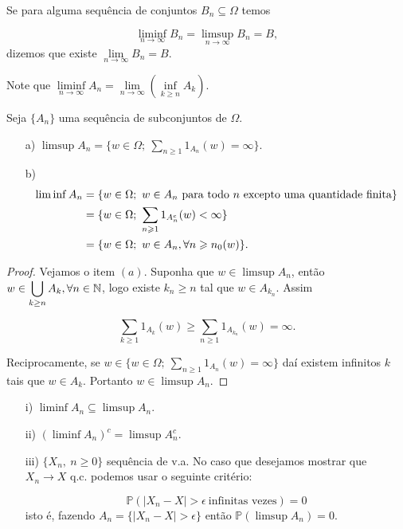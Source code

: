 \begin{definicao}
	Se para alguma sequência de conjuntos $B_n \subseteq \Omega$ temos

	$$
		\liminf \limits_{n \to \infty} B_n = \limsup \limits_{n \to \infty} B_n = B,
	$$	
	dizemos que existe $\lim \limits_{n \to \infty} B_n =B$.
\end{definicao}

Note que $\liminf \limits_{n\to \infty}A_n 
			=
			\lim \limits_{n\to \infty}\left(\inf \limits_{k\geqslant n}A_k \right)
		 $.


\begin{lema}
Seja $\{A_n\}$ uma sequência de subconjuntos de $\Omega$.
\begin{enumerate}
\item[a)] $\limsup A_n = \{ w \in \Omega;\ \sum_{n \geqslant 1} 1_{A_n}(w)= \infty \}$.
\item[b)] 
\begin{align*}
\vspace*{-2cm}
\liminf A_n & = \{ w \in \Omega;\ w \in A_n \text{ para todo $n$ excepto uma quantidade finita} \} \\
			& = \{w \in \Omega;\ \sum_{n\geqslant 1} 1_{A_n^c}(w) < \infty \} \\
			& = \{w \in \Omega;\ w \in A_n, \forall n \geqslant n_0(w) \}. 
\end{align*} 
\end{enumerate}
\end{lema}

\begin{proof}
Vejamos o item $(a)$. Suponha que $w \in \limsup A_n$, então $w \in \displaystyle\bigcup_{k \geq n} A_k,
\forall n \in \mathbb{N}$, logo existe $k_n \geqslant n$ tal que $w \in A_{k_n}$. Assim

	$$
		\sum \limits_{k \geqslant 1} 1_{A_k}(w) \geqslant \sum \limits_{n\geqslant 1} 1_{A_{k_n}}(w) 
		= 
		\infty.
	$$

Reciprocamente, se $ w \in \{ w \in \Omega;\ \sum_{n \geqslant 1} 1_{A_n}(w)= \infty \}$ daí existem 
infinitos $k$ tais que $w \in A_k$. Portanto $w \in \limsup A_n$.
\end{proof}

\begin{observacao}

\begin{enumerate}
\item[i)] $\liminf A_n \subseteq \limsup A_n$.
\item[ii)] $\left( \liminf A_n \right)^c = \limsup A_n^c$. 
\item[iii)] $\{X_n,\ n\geqslant 0\}$ sequência de v.a. No caso que desejamos mostrar que $X_n \to X$ q.c.
podemos usar o seguinte critério:

$$
	\mathbb{P}( |X_n-X| > \epsilon \ \text{infinitas vezes} )=0
$$ 
isto é, fazendo $A_n= \{ |X_n-X|> \epsilon\}$ então $\mathbb{P} (\limsup A_n )=0$.
\end{enumerate}
\end{observacao}

